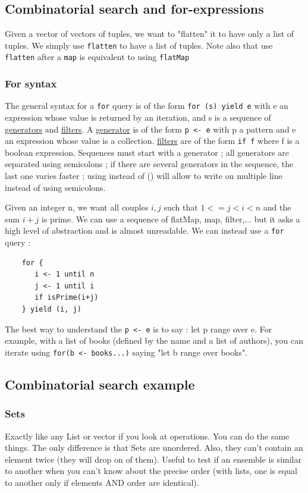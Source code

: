 \documentclass[12pt,a4paper]{article}
\begin{document}
\subsection{Combinatorial search and for-expressions}
Given a vector of vectors of tuples, we want to "flatten" it to have only a list of tuples. We simply use \texttt{flatten} to have a list of tuples. Note also that use \texttt{flatten} after a \texttt{map} is equivalent to using \texttt{flatMap}
\subsubsection{For syntax}
The general syntax for a \texttt{for} query is of the form \texttt{for (s) yield e} with e an expression whose value is returned by an iteration, and s is a sequence of \uline{generators} and \uline{filters}. A \uline{generator} is of the form \texttt{p <- e} with p a pattern and e an expression whose value is a collection. \uline{filters} are of the form \texttt{if f} where f is a boolean expression. Sequences must start with a generator ; all generators are separated using semicolons ; if there are several generators in the sequence, the last one varies faster ; using {} instead of () will allow to write on multiple line instead of using semicolons.

Given an integer n, we want all couples $i,j$ such that $1 <= j < i < n$ and the sum $i+j$ is prime. We can use a sequence of flatMap, map, filter,... but it asks a high level of abstraction and is almost unreadable. We can instead use a \texttt{for} query :
\begin{verbatim}
	for {
	   i <- 1 until n
	   j <- 1 until i
	   if isPrime(i+j)
	} yield (i, j)
\end{verbatim}

The best way to understand the \texttt{p <- e} is to say : let p range over e. For example, with a list of books (defined by the name and a list of authors), you can iterate using \texttt{for(b <- books...)} saying "let b range over books".

\subsection{Combinatorial search example}
\subsubsection{Sets}
Exactly like any List or vector if you look at operations. You can do the same things. The only difference is that Sets are unordered. Also, they can't contain an element twice (they will drop on of them). Useful to test if an ensemble is similar to another when you can't know about the precise order (with lists, one is equal to another only if elements AND order are identical).
\end{document}
